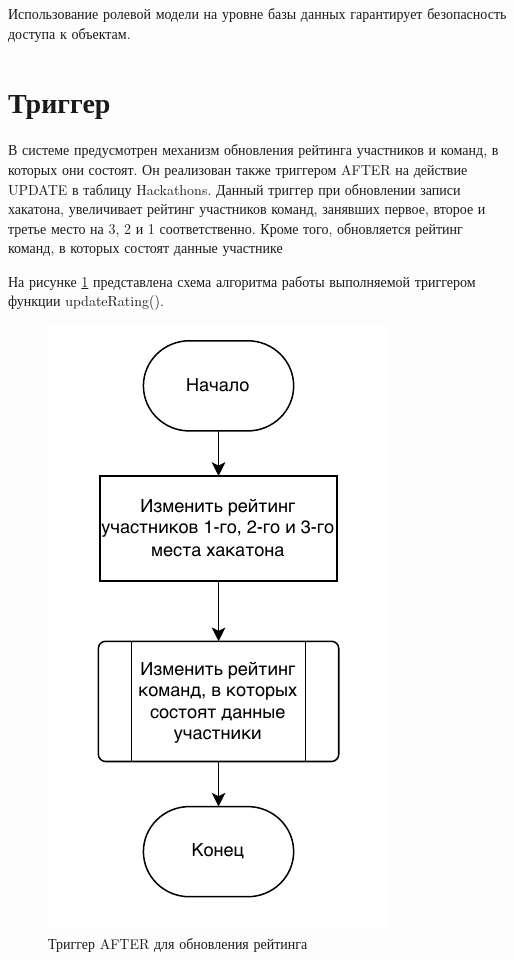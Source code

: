 Использование ролевой модели на уровне базы данных гарантирует безопасность доступа к объектам.

\section{Триггер}

В системе предусмотрен механизм обновления рейтинга участников и команд, в которых они состоят. Он реализован также триггером AFTER на действие UPDATE в таблицу Hackathons. Данный триггер при обновлении записи хакатона, увеличивает рейтинг участников команд, занявших первое, второе и третье место на 3, 2 и 1 соответственно. Кроме того, обновляется рейтинг команд, в которых состоят данные участнике

На рисунке \ref{trigger} представлена схема алгоритма работы выполняемой триггером функции updateRating().

\begin{figure}[H]
	\begin{center}
		\includegraphics[page=1,scale=1]{assets/trigger.drawio.pdf}
	\end{center}
	\caption{Триггер AFTER для обновления рейтинга}
	\label{trigger}
\end{figure}


